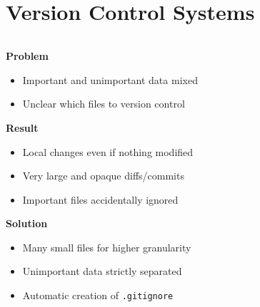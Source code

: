 \section{Version Control Systems}

\begin{frame}{\secname}

  \begin{columns}[onlytextwidth]
    \begin{column}{\textwidth-3.5cm}
      \textbf{Problem}
      \begin{itemize}
        \item Important and unimportant data mixed
        \item Unclear which files to version control
      \end{itemize}

      \pause

      \textbf{Result}
      \begin{itemize}
        \item Local changes even if nothing modified
        \item Very large and opaque diffs/commits
        \item Important files accidentally ignored
      \end{itemize}

      \pause

      \textbf{Solution}
      \begin{itemize}
        \item Many small files for higher granularity
        \item Unimportant data strictly separated
        \item Automatic creation of \texttt{.gitignore}
      \end{itemize}
    \end{column}

    \hfill

    \begin{column}{3.5cm}
      \color{blue}
    \end{column}
  \end{columns}
\end{frame}
